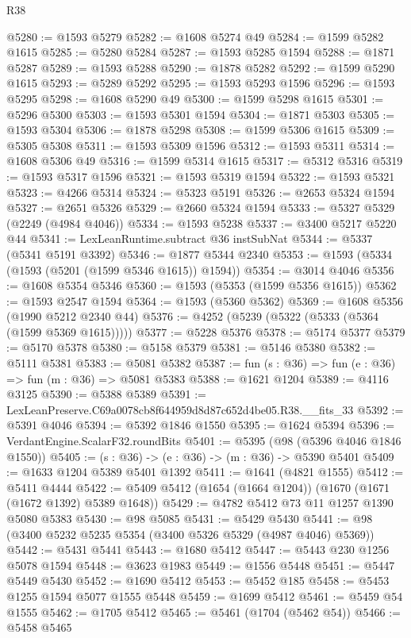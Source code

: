 \begin{lexlean}{R38}
\begin{coremodule}
@5280 := @1593 @5279
@5282 := @1608 @5274 @49
@5284 := @1599 @5282 @1615
@5285 := @5280 @5284
@5287 := @1593 @5285 @1594
@5288 := @1871 @5287
@5289 := @1593 @5288
@5290 := @1878 @5282
@5292 := @1599 @5290 @1615
@5293 := @5289 @5292
@5295 := @1593 @5293 @1596
@5296 := @1593 @5295
@5298 := @1608 @5290 @49
@5300 := @1599 @5298 @1615
@5301 := @5296 @5300
@5303 := @1593 @5301 @1594
@5304 := @1871 @5303
@5305 := @1593 @5304
@5306 := @1878 @5298
@5308 := @1599 @5306 @1615
@5309 := @5305 @5308
@5311 := @1593 @5309 @1596
@5312 := @1593 @5311
@5314 := @1608 @5306 @49
@5316 := @1599 @5314 @1615
@5317 := @5312 @5316
@5319 := @1593 @5317 @1596
@5321 := @1593 @5319 @1594
@5322 := @1593 @5321
@5323 := @4266 @5314
@5324 := @5323 @5191
@5326 := @2653 @5324 @1594
@5327 := @2651 @5326
@5329 := @2660 @5324 @1594
@5333 := @5327 @5329 (@2249 (@4984 @4046))
@5334 := @1593 @5238
@5337 := @3400 @5217 @5220 @44
@5341 := LexLeanRuntime.subtract @36 instSubNat
@5344 := @5337 (@5341 @5191 @3392)
@5346 := @1877 @5344 @2340
@5353 := @1593 (@5334 (@1593 (@5201 (@1599 @5346 @1615)) @1594))
@5354 := @3014 @4046
@5356 := @1608 @5354 @5346
@5360 := @1593 (@5353 (@1599 @5356 @1615))
@5362 := @1593 @2547 @1594
@5364 := @1593 (@5360 @5362)
@5369 := @1608 @5356 (@1990 @5212 @2340 @44)
@5376 := @4252 (@5239 (@5322 (@5333 (@5364 (@1599 @5369 @1615)))))
@5377 := @5228 @5376
@5378 := @5174 @5377
@5379 := @5170 @5378
@5380 := @5158 @5379
@5381 := @5146 @5380
@5382 := @5111 @5381
@5383 := @5081 @5382
@5387 := fun (s : @36) => fun (e : @36) => fun (m : @36) => @5081 @5383
@5388 := @1621 @1204
@5389 := @4116 @3125
@5390 := @5388 @5389
@5391 := LexLeanPreserve.C69a0078cb8f644959d8d87c652d4be05.R38.__fits_33
@5392 := @5391 @4046
@5394 := @5392 @1846 @1550
@5395 := @1624 @5394
@5396 := VerdantEngine.ScalarF32.roundBits
@5401 := @5395 (@98 (@5396 @4046 @1846 @1550))
@5405 := (s : @36) -> (e : @36) -> (m : @36) -> @5390 @5401
@5409 := @1633 @1204 @5389 @5401 @1392
@5411 := @1641 (@4821 @1555)
@5412 := @5411 @4444
@5422 := @5409 @5412 (@1654 (@1664 @1204)) (@1670 (@1671 (@1672 @1392) @5389 @1648))
@5429 := @4782 @5412 @73 @11 @1257 @1390 @5080 @5383
@5430 := @98 @5085
@5431 := @5429 @5430
@5441 := @98 (@3400 @5232 @5235 @5354 (@3400 @5326 @5329 (@4987 @4046) @5369))
@5442 := @5431 @5441
@5443 := @1680 @5412
@5447 := @5443 @230 @1256 @5078 @1594
@5448 := @3623 @1983
@5449 := @1556 @5448
@5451 := @5447 @5449 @5430
@5452 := @1690 @5412
@5453 := @5452 @185
@5458 := @5453 @1255 @1594 @5077 @1555 @5448
@5459 := @1699 @5412
@5461 := @5459 @54 @1555
@5462 := @1705 @5412
@5465 := @5461 (@1704 (@5462 @54))
@5466 := @5458 @5465

\end{coremodule}
\end{lexlean}
